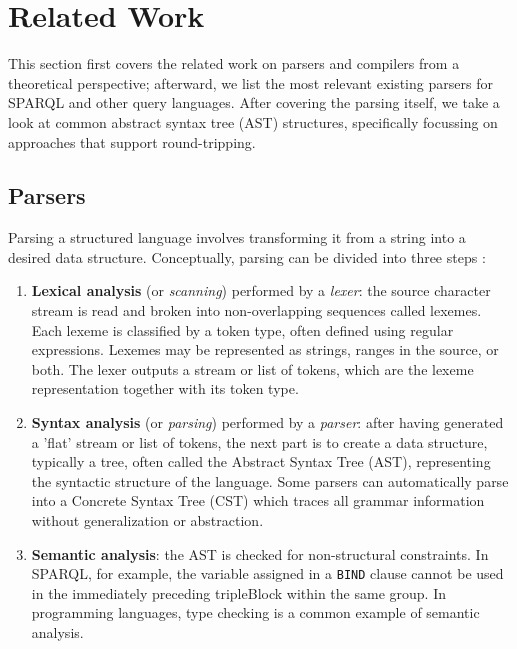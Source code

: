 \documentclass[runningheads]{llncs}
\begin{document}
    \section{Related Work}
    \label{sota}

    This section first covers the related work on parsers and compilers from a theoretical perspective;
    afterward, we list the most relevant existing parsers for SPARQL and other query languages.
    After covering the parsing itself, we take a look at common abstract syntax tree (AST) structures,
    specifically focussing on approaches that support round-tripping.

    \subsection{Parsers}

    Parsing a structured language involves transforming it from a string into a desired data structure.
    Conceptually, parsing can be divided into three steps \cite{alfred2007compilers}:

    \begin{enumerate}
        \item \textbf{Lexical analysis} (or \textit{scanning}) performed by a \textit{lexer}: the source character stream is read and broken into non-overlapping sequences called lexemes. Each lexeme is classified by a token type, often defined using regular expressions. Lexemes may be represented as strings, ranges in the source, or both. The lexer outputs a stream or list of tokens, which are the lexeme representation together with its token type.
        \item \textbf{Syntax analysis} (or \textit{parsing}) performed by a \textit{parser}: after having generated a 'flat' stream or list of tokens, the next part is to create a data structure, typically a tree, often called the Abstract Syntax Tree (AST), representing the syntactic structure of the language. Some parsers can automatically parse into a Concrete Syntax Tree (CST) which traces all grammar information without generalization or abstraction.
        \item \textbf{Semantic analysis}: the AST is checked for non-structural constraints. In SPARQL, for example, the variable assigned in a \texttt{BIND} clause cannot be used in the immediately preceding tripleBlock within the same group. In programming languages, type checking is a common example of semantic analysis.
    \end{enumerate}
\end{document}
